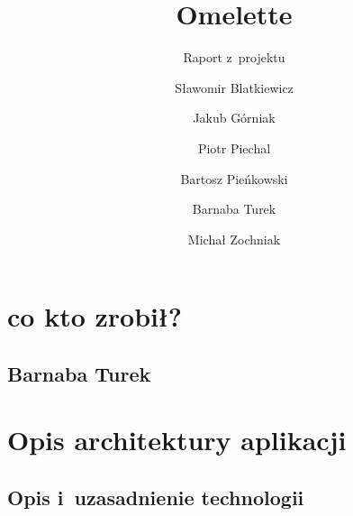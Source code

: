 \documentclass[a4paper]{scrartcl}
\begin{document}
\sloppy

\title{Omelette}
\subtitle{Raport z~projektu}
\author{
  Sławomir Blatkiewicz\and
  Jakub Górniak       \and
  Piotr Piechal       \and
  Bartosz Pieńkowski  \and
  Barnaba Turek       \and
  Michał Zochniak
}
\maketitle

\section{co kto zrobił?}
\subsection{Barnaba Turek}



\section{Opis architektury aplikacji}
\subsection{Opis i~uzasadnienie technologii}

\end{document}
